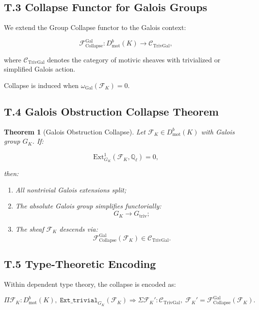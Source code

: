 \documentclass[11pt]{article}
\newtheorem{theorem}{Theorem}[section]
\begin{document}
\subsection*{T.3 Collapse Functor for Galois Groups}

We extend the Group Collapse functor to the Galois context:

\[
\mathcal{F}_{\mathrm{Collapse}}^{\mathrm{Gal}} : D^b_{\mathrm{mot}}(K) \longrightarrow \mathcal{C}_{\mathrm{TrivGal}},
\]

where $\mathcal{C}_{\mathrm{TrivGal}}$ denotes the category of motivic sheaves with trivialized or simplified Galois action.

Collapse is induced when $\omega_{\mathrm{Gal}}(\mathcal{F}_K) = 0$.

\subsection*{T.4 Galois Obstruction Collapse Theorem}

\begin{theorem}[Galois Obstruction Collapse]
Let $\mathcal{F}_K \in D^b_{\mathrm{mot}}(K)$ with Galois group $G_K$. If:

\[
\mathrm{Ext}^1_{G_K}(\mathcal{F}_K, \mathbb{Q}_\ell) = 0,
\]

then:
\begin{enumerate}
    \item All nontrivial Galois extensions split;
    \item The absolute Galois group simplifies functorially:
    \[
    G_K \longrightarrow G_{\mathrm{triv}};
    \]
    \item The sheaf $\mathcal{F}_K$ descends via:
    \[
    \mathcal{F}_{\mathrm{Collapse}}^{\mathrm{Gal}}(\mathcal{F}_K) \in \mathcal{C}_{\mathrm{TrivGal}}.
    \]
\end{enumerate}
\end{theorem}

\subsection*{T.5 Type-Theoretic Encoding}

Within dependent type theory, the collapse is encoded as:

\[
\Pi \mathcal{F}_K : D^b_{\mathrm{mot}}(K),\;
\texttt{Ext\_trivial}_{G_K}(\mathcal{F}_K)
\Rightarrow
\Sigma \mathcal{F}_K' : \mathcal{C}_{\mathrm{TrivGal}},\;
\mathcal{F}_K' = \mathcal{F}_{\mathrm{Collapse}}^{\mathrm{Gal}}(\mathcal{F}_K).
\]
\end{document}
